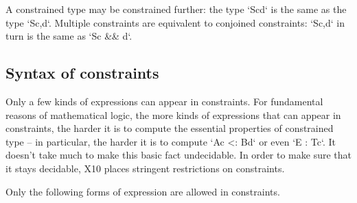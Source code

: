 
A constrained type may be constrained further: the type \xcd`S{c}{d}`
is the same as the type \xcd`S{c,d}`.  Multiple constraints are equivalent to
conjoined constraints: \xcd`S{c,d}` in turn is the same as \xcd`S{c && d}`.

\subsection{Syntax of constraints}
\label{PermittedConstraints}

Only a few kinds of expressions can appear in constraints.  For fundamental
reasons of mathematical logic, the more kinds of expressions that can appear
in constraints, the harder it is to compute the essential properties of
constrained type -- in particular, the harder it is to compute 
\xcd`A{c} <: B{d}` or even \xcd`E : T{c}`.  It doesn't take much to make this
basic fact undecidable. 
In order to make sure that it stays decidable, X10 places stringent restrictions on
constraints.  

Only the following forms of expression are allowed in constraints.  

